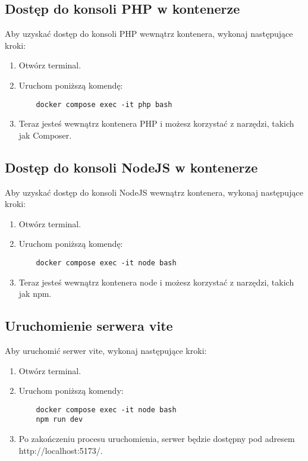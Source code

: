 \documentclass{article}
\begin{document}
\subsection{Dostęp do konsoli PHP w kontenerze}
Aby uzyskać dostęp do konsoli PHP wewnątrz kontenera, wykonaj następujące kroki:
\begin{enumerate}
    \item Otwórz terminal.
    \item Uruchom poniższą komendę:
    \begin{verbatim}
    docker compose exec -it php bash
    \end{verbatim}
    \item Teraz jesteś wewnątrz kontenera PHP i możesz korzystać z narzędzi, takich jak Composer.
\end{enumerate}

\subsection{Dostęp do konsoli NodeJS w kontenerze}
Aby uzyskać dostęp do konsoli NodeJS wewnątrz kontenera, wykonaj następujące kroki:
\begin{enumerate}
    \item Otwórz terminal.
    \item Uruchom poniższą komendę:
    \begin{verbatim}
    docker compose exec -it node bash
    \end{verbatim}
    \item Teraz jesteś wewnątrz kontenera node i możesz korzystać z narzędzi, takich jak npm.
\end{enumerate}

\subsection{Uruchomienie serwera vite}
Aby uruchomić serwer vite, wykonaj następujące kroki:
\begin{enumerate}
    \item Otwórz terminal.
    \item Uruchom poniższą komendy:
    \begin{verbatim}
    docker compose exec -it node bash
    npm run dev
    \end{verbatim}
    \item Po zakończeniu procesu uruchomienia, serwer będzie dostępny pod adresem http://localhost:5173/.
\end{enumerate}
\end{document}
